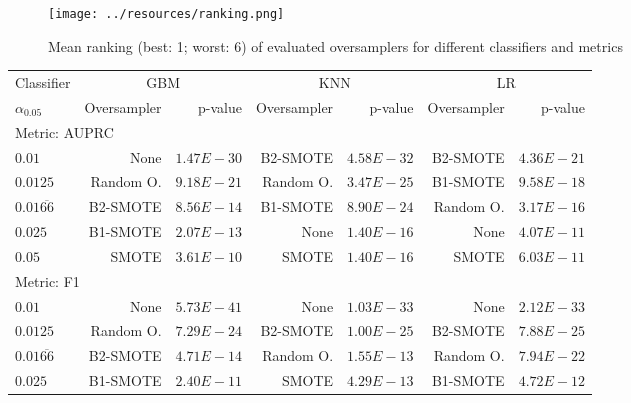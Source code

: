 \documentclass[sort&compress]{elsarticle}
\begin{document}
\begin{figure}[!htb]
\centering
\texttt{[image: ../resources/ranking.png]}
\caption[Mean ranking of evaluated oversamplers for different classifiers and metrics]{Mean ranking (best: 1; worst: 6) of evaluated oversamplers for different classifiers and metrics}
\label{fig:ranking}
\end{figure}

\begin{table}[!htb]
	\centering
	\begin{tabular}{lrrrrrr}
	\toprule
	\multicolumn{1}{c}{Classifier} &
	\multicolumn{2}{c}{GBM} &
	\multicolumn{2}{c}{KNN} &
	\multicolumn{2}{c}{LR}\\
	\cmidrule(lr){2-3}
	\cmidrule(lr){4-5}
	\cmidrule(lr){5-7}
	$\alpha _{0.05}$				&       Oversampler & p-value &       Oversampler & p-value &       Oversampler & p-value \\
	\midrule
	\multicolumn{2}{l}{Metric: AUPRC} & & & & & \\
	$0.01$        		& None              & $1.47E-30$ & B2-SMOTE          & $4.58E-32$ & B2-SMOTE          & $4.36E-21$ \\
	$0.0125$      		& Random O. & $9.18E-21$ & Random O. & $3.47E-25$ & B1-SMOTE          & $9.58E-18$ \\
	$0.01\overline{66}$ 	& B2-SMOTE          & $8.56E-14$ & B1-SMOTE          & $8.90E-24$ & Random O. & $3.17E-16$ \\
	$0.025$       		& B1-SMOTE          & $2.07E-13$ & None              & $1.40E-16$ & None              & $4.07E-11$ \\
	$0.05$        		& SMOTE             & $3.61E-10$ & SMOTE             & $1.40E-16$ & SMOTE             & $6.03E-11$ \\
	\multicolumn{2}{l}{Metric: F1} & & & & & \\
	$0.01$        		& None              & $5.73E-41$ & None              & $1.03E-33$ & None              & $2.12E-33$ \\
	$0.0125$      		& Random O. & $7.29E-24$ & B2-SMOTE          & $1.00E-25$ & B2-SMOTE          & $7.88E-25$ \\
	$0.01\overline{66}$ 	& B2-SMOTE          & $4.71E-14$ & Random O. & $1.55E-13$ & Random O. & $7.94E-22$ \\
	$0.025$       		& B1-SMOTE          & $2.40E-11$ & SMOTE             & $4.29E-13$ & B1-SMOTE          & $4.72E-12$ \\

\end{tabular}
\end{table}
\end{document}
